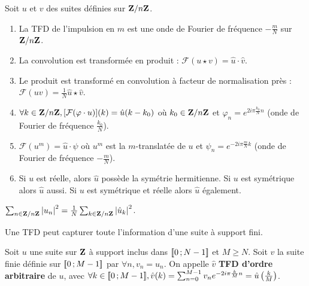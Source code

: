 \begin{pop}
	Soit $u$ et $v$ des suites définies sur $\mathbf{Z} / n\mathbf{Z}$.
	\begin{enumerate}
	\item
		La TFD de l'impulsion en $m$ est une onde de Fourier de fréquence $- \frac{m}{N}$ sur $\mathbf{Z} / n\mathbf{Z}$.
	\item
		La convolution est transformée en produit : $\mathcal{F} (u \star v) = \hat{u} \cdot \hat{v}$.
	\item
		Le produit est transformé en convolution à facteur de normalisation près : $\mathcal{F} (uv) = \frac{1}{N} \hat{u} \star \hat{v}$.
	\item
		$\forall k \in \mathbf{Z} / n\mathbf{Z}, [\mathcal{F}(\varphi \cdot u)](k) = \hat{u}(k - k_0)$ où $k_0 \in \mathbf{Z} / n\mathbf{Z}$ et $\varphi_n = e^{2i\pi \frac{k_0}{N}n}$ (onde de Fourier de fréquence $\frac{k_0}{N}$).
	\item
		$\mathcal{F}(u^m) = \hat{u} \cdot \psi$ où $u^m$ est la $m$-translatée de $u$ et $\psi_n = e^{-2i\pi \frac{m}{N}k}$ (onde de Fourier de fréquence $- \frac{m}{N}$).
	\item
		Si $u$ est réelle, alors $\hat{u}$ possède la symétrie hermitienne.
		Si $u$ est symétrique alors $\hat{u}$ aussi.
		Si $u$ est symétrique et réelle alors $\hat{u}$ également.
	\end{enumerate}
\end{pop}

\begin{pop}
	$\sum_{n \in \mathbf{Z} / n\mathbf{Z}} \left\lvert u_n\right\rvert^2 = \frac{1}{N} \sum_{k \in \mathbf{Z} / n\mathbf{Z}} \left\lvert\hat{u}_k\right\rvert^2$.
\end{pop}

\begin{rem}
	Une TFD peut capturer toute l'information d'une suite à support fini.
\end{rem}

\begin{defn}
	Soit $u$ une suite sur $\mathbf{Z}$ à support inclus dans $\mathopen{}\mathclose{\left[\![0\mathclose{}\mathpunct{};N - 1\right]\!]}$ et $M \geq N$.
	Soit $v$ la suite finie définie sur $\mathopen{}\mathclose{\left[\![0\mathclose{}\mathpunct{};M - 1\right]\!]}$ par $\forall n, v_n = u_n$.
	On appelle $\hat{v}$ \textbf{TFD d'ordre arbitraire} de $u$, avec $\forall k \in \mathopen{}\mathclose{\left[\![0\mathclose{}\mathpunct{};M - 1\right]\!]}, \hat{v}(k) = \sum_{n = 0}^{M - 1} v_n e^{-2i\pi \frac{k}{M} n} = \hat{u} \left( \frac{k}{M} \right)$.
\end{defn}